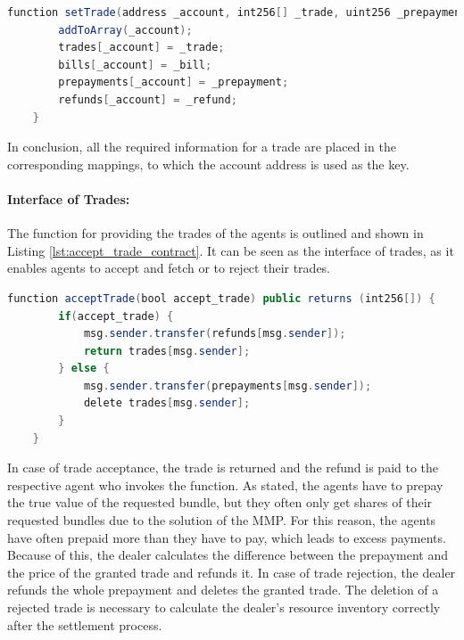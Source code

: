 \begin{lstlisting}[float=htbp, label=lst:set_trade_contract, caption=Receiving of Trades from Off-chain Dealer, language=Java]
    function setTrade(address _account, int256[] _trade, uint256 _prepayment, uint256 _bill, uint256 _refund) public onlyByOwner() {
        addToArray(_account);
        trades[_account] = _trade;
        bills[_account] = _bill;
        prepayments[_account] = _prepayment;
        refunds[_account] = _refund;
    }
\end{lstlisting}


In conclusion, all the required information for a trade are placed in the corresponding mappings, 
to which the account address is used as the key.

\paragraph{Interface of Trades:} The function for providing the trades of the agents is outlined and shown in Listing \ref{lst:accept_trade_contract}.
It can be seen as the interface of trades, as it enables agents 
to accept and fetch or to reject their trades.

\begin{lstlisting}[float=htbp, label=lst:accept_trade_contract, caption=Interface of Trades, language=Java]
    function acceptTrade(bool accept_trade) public returns (int256[]) {
        if(accept_trade) {
            msg.sender.transfer(refunds[msg.sender]);
            return trades[msg.sender];
        } else {
            msg.sender.transfer(prepayments[msg.sender]);
            delete trades[msg.sender];
        }
    }
\end{lstlisting}

In case of trade acceptance, the trade is returned and 
the refund is paid to the respective agent who invokes the function. 
As stated, the agents have to prepay the true value of the
requested bundle, but they often only get shares of their requested bundles due
to the solution of the MMP.
For this reason, the agents have often prepaid more than they have to pay, which leads to 
excess payments. Because of this, the dealer calculates the difference between the prepayment 
and the price of the granted trade and refunds it.
In case of trade rejection, the dealer refunds the whole prepayment and deletes the granted trade.
The deletion of a rejected trade is necessary to calculate the dealer's resource inventory correctly
after the settlement process.


